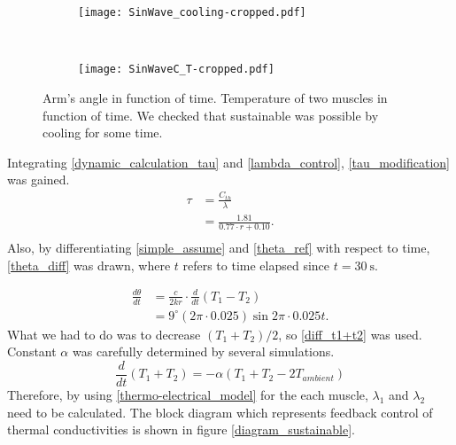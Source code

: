 \begin{figure}[t]
	\centering
	\begin{subfigure}[t]{0.45\textwidth}
		\texttt{[image: SinWave\_cooling-cropped.pdf]}
		\caption{\label{SinWave_cooling}}
	\end{subfigure}
	~
	\begin{subfigure}[t]{0.44\textwidth}
		\texttt{[image: SinWaveC\_T-cropped.pdf]}
		\caption{\label{Sinwave_C_T}}
	\end{subfigure}
	\caption[Sustainable open-loop \apc demonstration.]{ Arm's angle in function of time.  Temperature of two muscles in function of time. We checked that sustainable \apc was possible by cooling for some time.}
	\label{sustain_demo}
\end{figure}



Integrating \eqref{dynamic_calculation_tau} and \eqref{lambda_control}, \eqref{tau_modification} was gained.
\begin{equation} \label{tau_modification} 
\begin{aligned} 
\tau & = \frac{C_{th}}{\lambda} \\
& = \frac{1.81}{0.77\cdot r + 0.10}. \\ 
\end{aligned}
\end{equation}
Also, by differentiating \eqref{simple_assume} and \eqref{theta_ref} with respect to time, \eqref{theta_diff} was drawn, where $t$ refers to time elapsed since $t=\SI{30}{\second}$.

\begin{equation} \label{theta_diff}
\begin{aligned} 
\frac{d\theta}{dt} & = \frac{c}{2kr}\cdot\frac{d}{dt}(T_{1}-T_{2}) \\
& = 9^{\circ}(2\pi\cdot 0.025)\sin{2\pi\cdot 0.025t}.
\end{aligned}
\end{equation}
What we had to do was to decrease $(T_{1}+T_{2})/2$, so \eqref{diff_t1+t2} was used. Constant $\alpha$ was carefully determined by several simulations.
\begin{equation} \label{diff_t1+t2}
\frac{d}{dt}(T_{1}+T_{2}) = -\alpha(T_{1}+T_{2}-2T_{ambient})
\end{equation}
Therefore, by using \eqref{thermo-electrical_model} for the each muscle, $\lambda_{1}$ and $\lambda_{2}$ need to be calculated. The block diagram which represents feedback control of thermal conductivities is shown in figure \ref{diagram_sustainable}.

